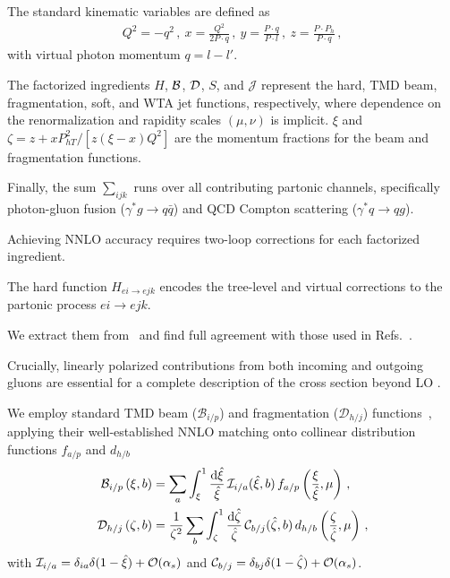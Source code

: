 \documentclass[prl,aps,twocolumn,superscriptaddress]{revtex4}
\def\d{{\rm d}}
\begin{document}
The standard kinematic variables are defined as
\begin{align}
Q^2=-q^2\,,~ x=\frac{Q^2}{2P\cdot q}\,, ~ y=\frac{P\cdot q}{P\cdot l}\,,~z=\frac{P\cdot P_h}{P\cdot q}\,,
\end{align}
with virtual photon momentum $q=l-l'$.

The factorized ingredients $H$, $\cal B$, $\cal D$, $S$, and $\mathcal{J}$ represent the hard, TMD beam, fragmentation, soft, and WTA jet functions, respectively, where dependence on the renormalization and rapidity scales $(\mu,\nu)$ is implicit. $\xi$ and $\zeta=z+xP_{hT}^2/[z (\xi-x) Q^2]$ are the momentum fractions for the beam and fragmentation functions.

Finally, the sum $\sum_{ijk}$ runs over all contributing partonic channels, specifically photon-gluon fusion ($\gamma^* g\to q \bar q$) and QCD Compton scattering ($\gamma^* q\to q g$).



Achieving NNLO accuracy requires two-loop corrections for each factorized ingredient.

The hard function $H_{ei\to ejk}$ encodes the tree-level and virtual corrections to the partonic process $ei \to ejk$.

We extract them from~\cite{Garland:2002ak, Gehrmann:2009vu} and find full agreement with those used in Refs.~\cite{Gehrmann:2022vuk, Gehrmann:2023zpz, NNLOJET:2025rno}.

Crucially, linearly polarized contributions from both incoming and outgoing gluons are essential for a complete description of the cross section beyond LO \cite{Catani:2010pd, Chien:2020hzh,  Gao:2023ivm}.



We employ standard TMD beam ($\mathcal{B}_{i/p}$) and fragmentation ($\mathcal{D}_{h/j}$) functions~\cite{Collins:2011zzd, Boussarie:2023izj}, applying their well-established NNLO matching onto collinear distribution functions $f_{a/p}$ and $d_{h/b}$ \cite{Catani:2011kr, Catani:2012qa, Gehrmann:2012ze, Gehrmann:2014yya, Luebbert:2016itl, Echevarria:2016scs, Luo:2019hmp, Luo:2019bmw}
\begin{align}
  {\cal B}_{i/p}\left(\xi,b\right) &=\sum_a \int_{\xi}^1 \frac{\d {\hat\xi}}{\hat\xi} \, {\cal I}_{i / a}(\hat\xi, b ) \,  f_{a/p}\left(\frac{\xi}{\hat\xi}, \mu\right)\,,   \nonumber \\
  {\cal D}_{h/j}\left(\zeta,b\right) &=
\frac{1}{\zeta^2}\sum_b \int_{\zeta}^1 \frac{\d {\hat\zeta }}{\hat\zeta} \, {\cal C}_{b / j}(\hat\zeta, b ) \, d_{h/b}\left(\frac{\zeta}{\hat\zeta}, \mu\right) \,,
\end{align}
with ${\cal I}_{i / a}=\delta_{ia}\delta(1-\hat\xi)+\mathcal{O}(\alpha_s)$ and ${\cal C}_{b / j}=\delta_{bj}\delta(1-\hat\zeta)+\mathcal{O}(\alpha_s)$.
\end{document}

